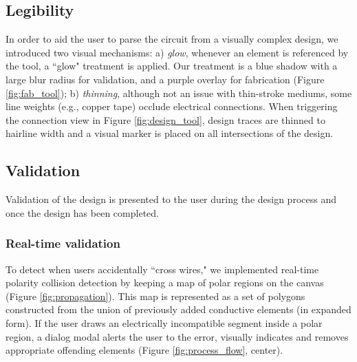 \documentclass{sigchi}
\begin{document}
    \noindent{}
    \subsection{Legibility}
        In order to aid the user to parse the circuit from a visually complex design, we introduced two visual mechanisms: a) \textit{glow}, whenever an element is referenced by the tool, a ``glow" treatment is applied. Our treatment is a blue shadow with a large blur radius for validation, and a purple overlay for fabrication (Figure \ref{fig:fab_tool}); b) \textit{thinning}, although not an issue with thin-stroke mediums, some line weights (e.g., copper tape) occlude electrical connections. When triggering the connection view in Figure \ref{fig:design_tool}, design traces are thinned to hairline width and a visual marker is placed on all intersections of the design.
        
\subsection{Validation}
    Validation of the design is presented to the user during the design process and once the design has been completed. %
    \subsubsection{Real-time validation}
        To detect when users accidentally ``cross wires," we implemented real-time polarity collision detection by keeping a map of polar regions on the canvas (Figure \ref{fig:propagation}). This map is represented as a set of polygons constructed from the union of previously added conductive elements (in expanded form).
        If the user draws an electrically incompatible segment inside a polar region, a dialog modal alerts the user to the error, visually indicates and removes appropriate offending elements (Figure \ref{fig:process_flow}, center).
\end{document}
